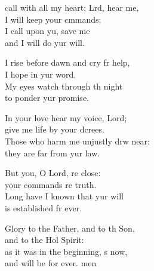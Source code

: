 \settowidth{\versewidth}{I call with all my heart; Lord, hear me, *}
\begin{psalmverse}%
  \begin{patverse}
     call with all my heart; Lrd, hear me,\Med\\
I will keep your cmmands;\\
I call upon yu, save me\Med\\
and I will do yur will.

I rise before dawn and cry fr help,\Med\\
I hope in yur word.\\
My eyes watch through th night\Med\\
to ponder yur promise.

In your love hear my voice,  Lord;\Med\\
give me life by your dcrees.\\
Those who harm me unjustly drw near:\Med\\
they are far from yur law.

But you, O Lord, re close:\Med\\
your commands re truth.\\
Long have I known that yur will\Med\\
is established fr ever.

Glory to the Father, and to th Son,\Med\\
and to the Hol Spirit:\\
as it was in the beginning, \pointup{\i}s now,\Med\\
and will be for ever. men
  \end{patverse}
\end{psalmverse}
